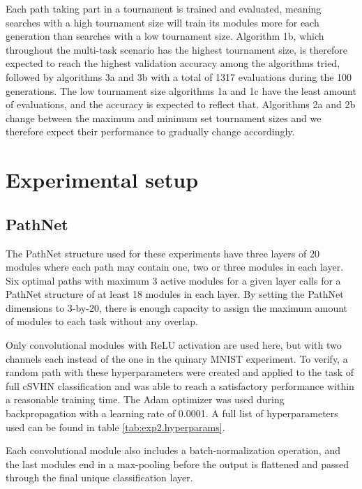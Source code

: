 Each path taking part in a tournament is trained and evaluated, meaning searches with a high tournament size will train its modules more for each generation than searches with a low tournament size. Algorithm 1b, which throughout the multi-task scenario has the highest tournament size, is therefore expected to reach the highest validation accuracy among the algorithms tried, followed by algorithms 3a and 3b with a total of 1317 evaluations during the 100 generations. The low tournament size algorithms 1a and 1c have the least amount of evaluations, and the accuracy is expected to reflect that. Algorithms 2a and 2b change between the maximum and minimum set tournament sizes and we therefore expect their performance to gradually change accordingly.

\section{Experimental setup}
\label{exp2:implementation}

\subsection{PathNet}
The PathNet structure used for these experiments have three layers of 20 modules where each path may contain one, two or three modules in each layer. Six optimal paths with maximum 3 active modules for a given layer calls for a PathNet structure of at least 18 modules in each layer. By setting the PathNet dimensions to 3-by-20, there is enough capacity to assign the maximum amount of modules to each task without any overlap.




Only convolutional modules with ReLU activation are used here, but with two channels each instead of the one in the quinary MNIST experiment. To verify, a random path with these hyperparameters were created and applied to the task of full cSVHN classification and was able to reach a satisfactory performance within a reasonable training time. The Adam optimizer was used during backpropagation with a learning rate of 0.0001. A full list of hyperparameters used can be found in table \ref{tab:exp2.hyperparams}. 

Each convolutional module also includes a batch-normalization operation, and the last modules end in a max-pooling before the output is flattened and passed through the final unique classification layer. 

